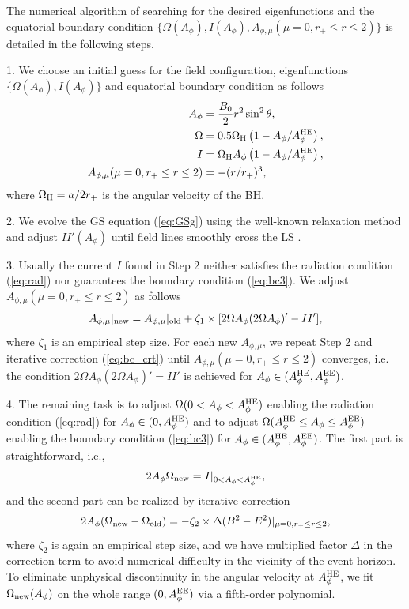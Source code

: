\documentclass[aps,prd,reprint,nofootinbib, superscriptaddress]{revtex4-1}
\def\sst{\sin^2\theta}
\def\Ap{A_\phi}
\def\Am{A_{\phi,\mu}}
\def\be{\begin{equation}}
\def\ee{\end{equation}}
\def\WH{\Omega_{\rm H}}
\def\AHE{A_\phi^{\rm HE}}
\def\AEE{A_\phi^{\rm EE}}
\begin{document}
The numerical algorithm of searching for the desired eigenfunctions and the equatorial
boundary condition $\{\Omega(A_\phi), I(A_\phi), \Am(\mu =0, r_+\leq r \leq 2)\}$
is detailed in the following steps.

1. We choose an initial guess for the field configuration, eigenfunctions
$\{ \Omega(\Ap), I(\Ap)\}$
and equatorial boundary condition  as follows
\begin{subequations}
\begin{align}
    \Ap &= \frac{B_0}{2}r^2 \sst,  \label{eq:gss1} \\
    \Omega & = 0.5\WH\left(1-\Ap/\AHE\right),  \label{eq:gss2}\\
    I & = \WH \Ap\left(1-\Ap/\AHE\right) , \\
    \Am(\mu =0, r_+\leq r \leq 2) & = - (r/r_+)^3, \label{eq:gss3}
\end{align}
\end{subequations}
where $\WH = a/2r_+$ is the angular velocity of the BH.

2. We evolve the GS equation (\ref{eq:GSg}) using the well-known relaxation method \cite{Press1987}
 and adjust $II'(\Ap)$ until  field lines smoothly cross the LS
\cite[see e.g.][for more details]{Contopoulos2013, Nathanail2014, Pan2017, Mahlmann2018}.

3. Usually the current $I$ found in Step 2 neither satisfies the radiation condition (\ref{eq:rad})
nor guarantees the boundary condition (\ref{eq:bc3}). We  adjust
$\Am(\mu = 0, r_+ \leq r\leq 2)$ as follows
\be
\label{eq:bc_crt}
 A_{\phi,\mu}|_{\rm new}  = A_{\phi,\mu}|_{\rm old} + \zeta_1\times[2\Omega\Ap(2\Omega\Ap)' -II'],
\ee
where $\zeta_1$ is an empirical step size. For each new $A_{\phi,\mu}$, we repeat Step 2 and iterative
correction (\ref{eq:bc_crt}) until $\Am(\mu = 0, r_+ \leq r\leq 2)$ converges, i.e. the condition $2\Omega\Ap(2\Omega\Ap)' = II'$ is
achieved for $A_\phi\in (A_\phi^{\rm HE}, A_\phi^{\rm EE})$.

4. The remaining task is to adjust  $\Omega(0< \Ap < \AHE)$ enabling  the radiation condition (\ref{eq:rad})
 for $A_\phi \in (0, A_\phi^{\rm HE})$ and  to adjust $\Omega(\AHE \leq \Ap \leq \AEE)$
 enabling the boundary condition (\ref{eq:bc3}) for $\Ap \in (\AHE, \AEE)$.
 The first part is straightforward, i.e.,
 \be
2\Ap\Omega_{\rm new}  = I|_{0 < \Ap < \AHE},
 \ee
 and the second part can be realized by iterative correction
 \be
2\Ap(\Omega_{\rm new} - \Omega_{\rm old}) =  - \zeta_2\times\Delta (B^2-E^2)|_{\mu=0, r_+\leq r \leq 2},
 \ee
 where $\zeta_2$ is again an empirical step size, and we have multiplied factor $\Delta$
 in the correction term to avoid numerical difficulty in the vicinity of the event horizon.
 To eliminate unphysical discontinuity in the angular
 velocity at $\AHE$, we fit $\Omega_{\rm new}(\Ap)$ on the whole range
 $(0, \AEE)$ via a fifth-order polynomial.
\end{document}
